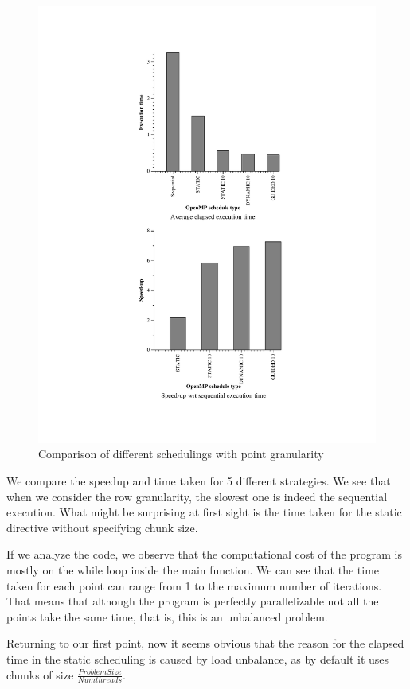 \documentclass[11pt]{article}
\begin{document}
\begin{figure}[!htb]
\begin{minipage}[t]{0.48\textwidth}
    \centerline{\includegraphics[width=1.5\linewidth]{./For/point/point.pdf}}
    \caption{Comparison of different schedulings with point granularity}
  \end{minipage}
\end{figure}
\FloatBarrier
We compare the speedup and time taken for 5 different strategies. We see that when we consider the row granularity, the slowest one is indeed the sequential execution. What might be surprising at first sight is the time taken for the static directive without specifying chunk size. 

If we analyze the code, we observe that the computational cost of the program is mostly on the while loop inside the main function. We can see that the time taken for each point can range from 1 to the maximum number of iterations. That means that although the program is perfectly parallelizable not all the points take the same time, that is, this is an unbalanced problem.

Returning to our first point, now it seems obvious that the reason for the elapsed time in the static scheduling is caused by load unbalance, as by default it uses chunks of size \(\frac{Problem Size}{Num threads}\). 
\end{document}
